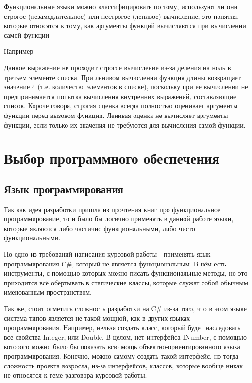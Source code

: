 Функциональные языки можно классифицировать по тому, используют ли они строгое (незамедлительное) или нестрогое (ленивое) вычисление, это понятия, которые относятся к тому, как аргументы функций вычисляются при вычислении самой функции.

Например:

\begin{code}
	
\end{code}

Данное выражение не проходит строгое вычисление из-за деления на ноль в третьем элементе списка.
При ленивом вычислении функция длины возвращает значение 4 (т.е. количество элементов в списке), поскольку при ее вычислении не предпринимается попытка вычисления внутренних выражений, составляющие список.
Короче говоря, строгая оценка всегда полностью оценивает аргументы функции перед вызовом функции.
Ленивая оценка не вычисляет аргументы функции, если только их значения не требуются для вычисления самой функции.


\newpage
\section{Выбор программного обеспечения}

\subsection{Язык программирования}

Так как идея разработки пришла из прочтения книг про функциональное программирование, то и было бы логично применять в данной работе языки, которые являются либо частично функциональными, либо чисто функциональными.

Но одно из требований написания курсовой работы - применять язык программирования C\#, который не является функциональным.
В нём есть инструменты, с помощью которых можно писать функциональные методы, но это приходится всё обёртывать в статические классы, которые служат собой обычным именованным пространством.

Так же, стоит отметить сложность разработки на C\# из-за того, что в этом языке система типов является не такой мощной, как в других языках программирования.
Например, нельзя создать класс, который будет наследовать все свойства Integer, или Double.
В целом, нет интерфейса INumber, с помощью которого можно было бы показать всю мощь объектно-ориентированного языка программирования.
Конечно, можно самому создать такой интерфейс, но тогда сложность проекта возросла, из-за интерфейсов, классов, которые вообще никак не относятся к теме разговора курсовой работы.

